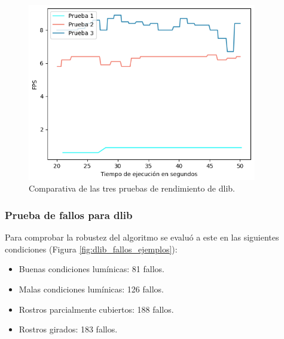 \begin{figure} [h!]
  \begin{center}
    \includegraphics[width=10cm]{figs/dlib_rendimiento.png}
  \end{center}
  \captionsetup{justification=centering}
  \caption{Comparativa de las tres pruebas de rendimiento de dlib.}
  \label{fig:dlib_rendimiento}
\end{figure}

\subsubsection{Prueba de fallos para dlib}

Para comprobar la robustez del algoritmo se evaluó a este en las siguientes condiciones (Figura \ref{fig:dlib_fallos_ejemplos}):

\begin{itemize}
    \item Buenas condiciones lumínicas: 81 fallos.
    \item Malas condiciones lumínicas: 126 fallos.
    \item Rostros parcialmente cubiertos: 188 fallos.
    \item Rostros girados: 183 fallos.
\end{itemize}

